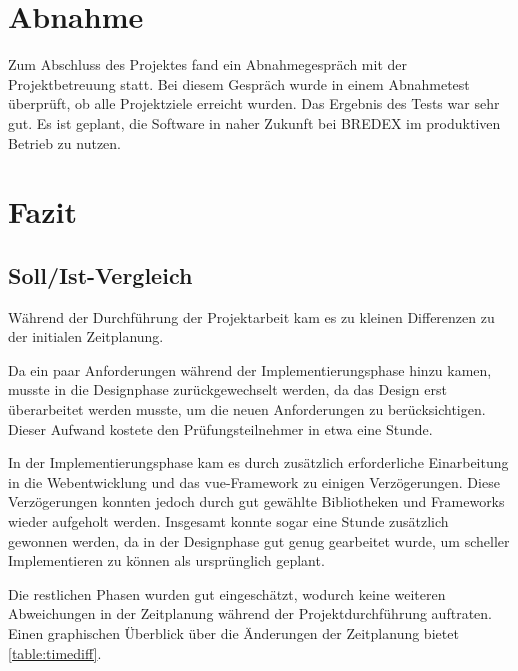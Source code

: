 \documentclass[11pt]{article}
\begin{document}
%
%

\section{Abnahme}
Zum Abschluss des Projektes fand ein Abnahmegespräch mit der Projektbetreuung statt. Bei diesem
Gespräch wurde in einem Abnahmetest überprüft, ob alle Projektziele erreicht wurden.
Das Ergebnis des Tests war sehr gut.
Es ist geplant, die Software in naher Zukunft bei BREDEX im produktiven 
Betrieb zu nutzen.



%
%

\section{Fazit}


\subsection{Soll/Ist-Vergleich}

Während der Durchführung der Projektarbeit kam es zu kleinen Differenzen zu der initialen Zeitplanung.

Da ein paar Anforderungen während der Implementierungsphase hinzu kamen, musste in die Designphase zurückgewechselt werden, da
das Design erst überarbeitet werden musste, um die neuen Anforderungen zu berücksichtigen. Dieser Aufwand kostete den Prüfungsteilnehmer in etwa eine Stunde. 

In der Implementierungsphase kam es durch zusätzlich erforderliche Einarbeitung in die Webentwicklung und das \Gls{vue}-Framework zu einigen Verzögerungen.
Diese Verzögerungen konnten jedoch durch gut gewählte Bibliotheken und Frameworks wieder aufgeholt werden.
Insgesamt konnte sogar eine Stunde zusätzlich gewonnen werden, da in der Designphase gut genug gearbeitet wurde,
um scheller Implementieren zu können als ursprünglich geplant. 

Die restlichen Phasen wurden gut eingeschätzt, wodurch keine weiteren Abweichungen in der Zeitplanung während der 
Projektdurchführung auftraten.\newline
Einen graphischen Überblick über die Änderungen der Zeitplanung bietet \autoref{table:timediff}.
\end{document}
